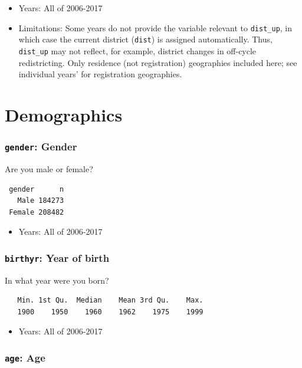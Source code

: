 \documentclass[10pt,article,oneside]{memoir}
\theoremstyle{definition}
\begin{document}
\begin{itemize}
\tightlist
\item
  Years: All of 2006-2017
\item
  Limitations: Some years do not provide the variable relevant to
  \texttt{dist\_up}, in which case the current district (\texttt{dist})
  is assigned automatically. Thus, \texttt{dist\_up} may not reflect,
  for example, district changes in off-cycle redistricting. Only
  residence (not registration) geographies included here; see individual
  years' for registration geographies.
\end{itemize}

\section{Demographics}\label{demographics}

\subsubsection{\texorpdfstring{\texttt{gender}:
Gender}{gender: Gender}}\label{gender-gender}

Are you male or female?

\begin{verbatim}
 gender      n
   Male 184273
 Female 208482
\end{verbatim}

\begin{itemize}
\tightlist
\item
  Years: All of 2006-2017
\end{itemize}

\subsubsection{\texorpdfstring{\texttt{birthyr}: Year of
birth}{birthyr: Year of birth}}\label{birthyr-year-of-birth}

In what year were you born?

\begin{verbatim}
   Min. 1st Qu.  Median    Mean 3rd Qu.    Max. 
   1900    1950    1960    1962    1975    1999 
\end{verbatim}

\begin{itemize}
\tightlist
\item
  Years: All of 2006-2017
\end{itemize}

\subsubsection{\texorpdfstring{\texttt{age}:
Age}{age: Age}}\label{age-age}
\end{document}
